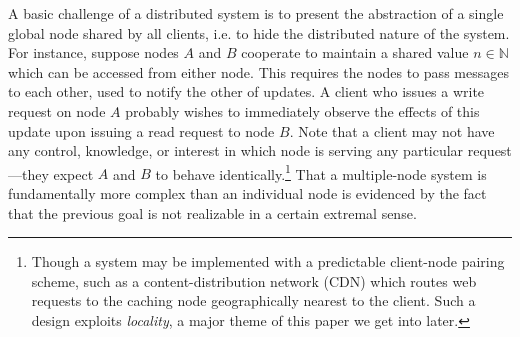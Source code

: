 A basic challenge of a distributed system is to present the abstraction of a single global node shared by all clients, i.e. to hide the distributed nature of the system. For instance, suppose nodes $A$ and $B$ cooperate to maintain a shared value $n \in \mathbb{N}$ which can be accessed from either node. This requires the nodes to pass messages to each other, used to notify the other of updates. A client who issues a write request on node $A$ probably wishes to immediately observe the effects of this update upon issuing a read request to node $B$. Note that a client may not have any control, knowledge, or interest in which node is serving any particular request---they expect $A$ and $B$ to behave identically.\footnote{Though a system may be implemented with a predictable client-node pairing scheme, such as a content-distribution network (CDN) which routes web requests to the caching node geographically nearest to the client. Such a design exploits \emph{locality}, a major theme of this paper we get into later.} That a multiple-node system is fundamentally more complex than an individual node is evidenced by the fact that the previous goal is not realizable in a certain extremal sense.

